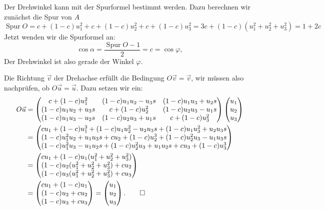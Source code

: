 \begin{loesung}
\begin{teilaufgaben}
\item
Der Drehwinkel kann mit der Spurformel bestimmt werden. Dazu berechnen
wir zunächst die Spur von $A$
\[
\operatorname{Spur}O=
c+(1-c)u_1^2+c+(1-c)u_2^2+c+(1-c)u_3^2=3c+(1-c)(u_1^2+u_2^2+u_3^2)=1+2c
\]
Jetzt wenden wir die Spurformel an:
\[
\cos\alpha=\frac{\operatorname{Spur}O-1}2=c=\cos\varphi,
\]
Der Drehwinkel ist also gerade der Winkel $\varphi.$
\item
Die Richtung $\vec v$ der Drehachse erfüllt die Bedingung $O\vec v=\vec v$,
wir müssen also nachprüfen, ob $O\vec u=\vec u$.
Dazu setzen wir ein:
\begin{align*}
O\vec u
&=
\begin{pmatrix}
c+(1-c)u_1^2    &(1-c)u_1u_2-u_3s   &(1-c)u_1u_3+u_2s\\
(1-c)u_1u_2+u_3s&c+(1-c)u_2^2       &(1-c)u_2u_3-u_1s\\
(1-c)u_1u_3-u_2s&(1-c)u_2u_3+u_1s   &c+(1-c)u_3^2
\end{pmatrix}
\begin{pmatrix}u_1\\u_2\\u_3\end{pmatrix}
\\
&=
\begin{pmatrix}
cu_1+(1-c)u_1^3 +(1-c)u_1u_2^2-u_2u_3s+(1-c)u_1u_3^2+u_2u_3s\\
(1-c)u_1^2u_2+u_1u_3s+cu_2+(1-c)u_2^3+(1-c)u_2^2u_3-u_1u_3s\\
(1-c)u_1^2u_3-u_1u_2s+(1-c)u_2^2u_3+u_1u_2s+cu_3+(1-c)u_3^3
\end{pmatrix}
\\
&=
\begin{pmatrix}
cu_1+(1-c)u_1(u_1^2+u_2^2+u_3^2)\\
(1-c)u_2(u_1^2+u_2^2+u_3^2)+cu_2\\
(1-c)u_3(u_1^2+u_2^2+u_3^2)+cu_3
\end{pmatrix}
\\
&=
\begin{pmatrix}
cu_1+(1-c)u_1\\
(1-c)u_2+cu_2\\
(1-c)u_3+cu_3
\end{pmatrix}
=\begin{pmatrix}u_1\\u_2\\u_3\end{pmatrix}.
\qedhere
\end{align*}
\end{teilaufgaben}
\end{loesung}

